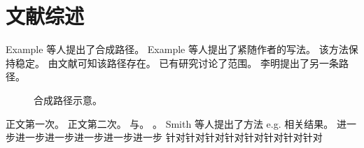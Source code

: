 \chapter{文献综述}
Example 等人提出了合成路径\cite{example2020}。
Example 等人\cite{moved2020}提出了紧随作者的写法。
该方法保持稳定\cite{stable2020}。
由文献\cite{stable2020}可知该路径存在。
已有研究\cite{prior2020}讨论了范围。
李明提出了另一条路径\cite{liming2020}。
\begin{figure}
\caption{合成路径示意。}
\label{fig:path}
\end{figure}
正文第一次\cite{repeat2020}。
正文第二次\cite{repeat2020}。
\citep[12]{paged2020}与\citep[13]{paged2020}。
\cite[12]{sharedA,sharedB}。
Smith 等人提出了方法 e.g. 相关结果\cite{smith2020}。
进一步进一步进一步进一步进一步进一步
针对针对针对针对针对针对针对针对
